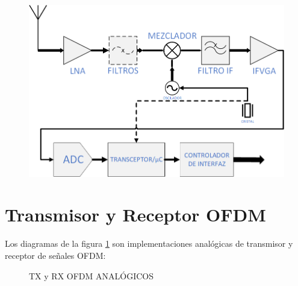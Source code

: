 \documentclass[a4paper,12pt]{report} %
\begin{document}
\begin{figure}[H]
	\centering
	\includegraphics[scale=0.6]{Imagenes/Arquitectura/esquema1}
\end{figure}



\section{Transmisor y Receptor OFDM \cite{tesis}}

Los diagramas de la figura \ref{txrx} son implementaciones analógicas de transmisor y receptor de señales OFDM:

\begin{figure}[H]
	\centering
	\caption{TX y RX OFDM ANALÓGICOS}
	\label{txrx}
\end{figure}
\end{document}
